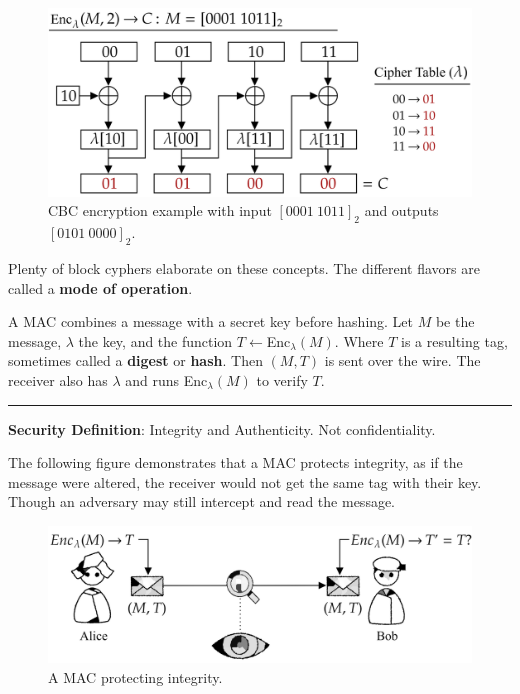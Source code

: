\vspace{-1em}
\begin{figure}[h!]
    \centering
    \includegraphics[width=.8\textwidth]{Sections/sec/enc/cbc_ex.png}
    \caption{CBC encryption example with input $[0001\ 1011]_2$ and outputs $[0101\ 0000]_2$.}
    \label{fig:block_cipher}
\end{figure}

\noindent
Plenty of block cyphers elaborate on these concepts. The different flavors are called a \textbf{mode of operation}.

\begin{Def}

    \label{theo:mac}
    A MAC combines a message with a secret key before hashing.
    Let $M$ be the message, $\lambda$ the key, and the function $T\gets$Enc$_\lambda(M)$. Where $T$ is a resulting tag, sometimes called 
    a \textbf{digest} or \textbf{hash}. Then $(M,T)$ is sent over the wire. The receiver also has $\lambda$ and runs Enc$_\lambda(M)$ to verify $T$.\\
    \noindent
    \rule{\textwidth}{0.4pt}
    \textbf{Security Definition}: Integrity and Authenticity. Not confidentiality.
\end{Def}

\newpage 
\noindent
The following figure demonstrates that a MAC protects integrity, as if the message were altered, the receiver would 
not get the same tag with their key. Though an adversary may still intercept and read the message.

\begin{figure}[h!]
    \centering
    \includegraphics[width=.8\textwidth]{Sections/sec/enc/mac.png}
    \caption{A MAC protecting integrity.}
    \label{fig:block_cipher}
\end{figure}

